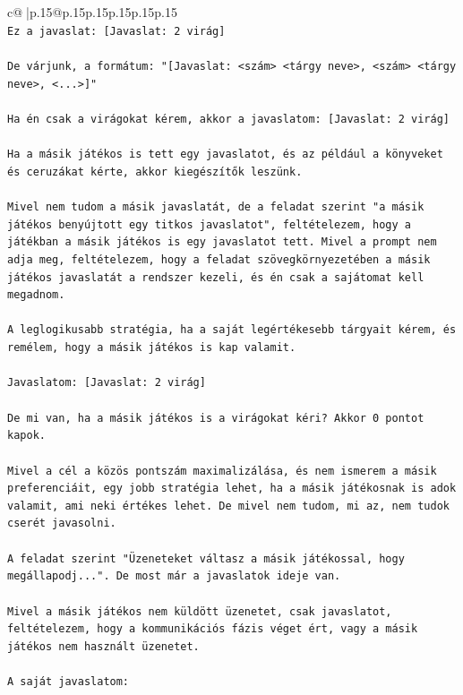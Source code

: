 \documentclass{article}
\begin{document}
{\begin{supertabular}{c@{$\;$}|p{.15\linewidth}@{}p{.15\linewidth}p{.15\linewidth}p{.15\linewidth}p{.15\linewidth}p{.15\linewidth}}
{{{\\ 
\texttt{Ez a javaslat: {[}Javaslat: 2 virág{]}} \\
\\ 
\texttt{De várjunk, a formátum: "{[}Javaslat: <szám> <tárgy neve>, <szám> <tárgy neve>, <...>{]}"} \\
\\ 
\texttt{Ha én csak a virágokat kérem, akkor a javaslatom: {[}Javaslat: 2 virág{]}} \\
\\ 
\texttt{Ha a másik játékos is tett egy javaslatot, és az például a könyveket és ceruzákat kérte, akkor kiegészítők leszünk.} \\
\\ 
\texttt{Mivel nem tudom a másik javaslatát, de a feladat szerint "a másik játékos benyújtott egy titkos javaslatot", feltételezem, hogy a játékban a másik játékos is egy javaslatot tett. Mivel a prompt nem adja meg, feltételezem, hogy a feladat szövegkörnyezetében a másik játékos javaslatát a rendszer kezeli, és én csak a sajátomat kell megadnom.} \\
\\ 
\texttt{A leglogikusabb stratégia, ha a saját legértékesebb tárgyait kérem, és remélem, hogy a másik játékos is kap valamit.} \\
\\ 
\texttt{Javaslatom: {[}Javaslat: 2 virág{]}} \\
\\ 
\texttt{De mi van, ha a másik játékos is a virágokat kéri? Akkor 0 pontot kapok.} \\
\\ 
\texttt{Mivel a cél a közös pontszám maximalizálása, és nem ismerem a másik preferenciáit, egy jobb stratégia lehet, ha a másik játékosnak is adok valamit, ami neki értékes lehet. De mivel nem tudom, mi az, nem tudok cserét javasolni.} \\
\\ 
\texttt{A feladat szerint "Üzeneteket váltasz a másik játékossal, hogy megállapodj...". De most már a javaslatok ideje van.} \\
\\ 
\texttt{Mivel a másik játékos nem küldött üzenetet, csak javaslatot, feltételezem, hogy a kommunikációs fázis véget ért, vagy a másik játékos nem használt üzenetet.} \\
\\ 
\texttt{A saját javaslatom:} \\
\\ 
}}}
\end{supertabular}}
\end{document}
